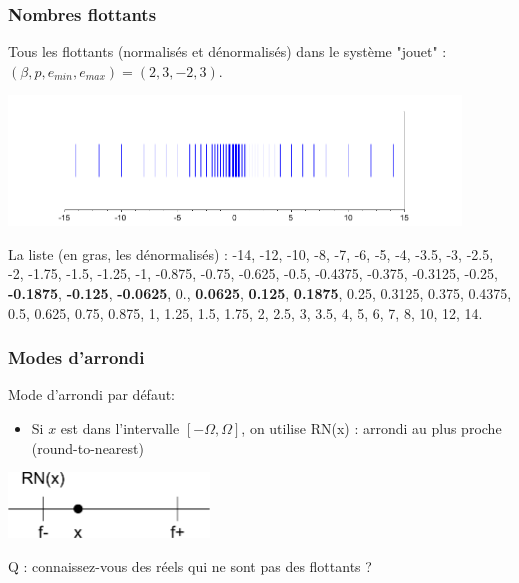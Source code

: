 \documentclass{beamer}
\begin{document}



\begin{frame}
\frametitle{Nombres flottants}

Tous les flottants (normalisés et dénormalisés) dans le système "jouet" : $(\beta,p,e_{min},e_{max})=(2,3,-2,3)$.

\begin{center}
\includegraphics[width=0.9\textwidth]{toysystem_all}
\end{center}

La liste (en gras, les dénormalisés) :
-14, -12, -10, -8, -7, -6, -5, -4, -3.5, -3, -2.5, -2, -1.75, 
-1.5, -1.25, -1, -0.875, -0.75, -0.625, -0.5, -0.4375, -0.375, 
-0.3125, -0.25, \textbf{-0.1875}, \textbf{-0.125}, \textbf{-0.0625}, 
0., \textbf{0.0625}, \textbf{0.125}, \textbf{0.1875}, 0.25, 0.3125, 0.375, 
0.4375, 0.5, 0.625, 0.75, 0.875, 1, 1.25, 1.5, 1.75, 2, 2.5, 3, 
3.5, 4, 5, 6, 7, 8, 10, 12, 14.

\end{frame}


\begin{frame}
\frametitle{Modes d'arrondi}

Mode d'arrondi par défaut:
\begin{itemize}
\item Si $x$ est dans l'intervalle $[-\Omega,\Omega]$, on utilise RN(x) : arrondi au plus proche (round-to-nearest)
\end{itemize}

\begin{center}
\includegraphics[width=0.4\textwidth]{roundingmodes-RN}
\end{center}

Q : connaissez-vous des réels qui ne sont pas des flottants ?

\end{frame}
\end{document}
